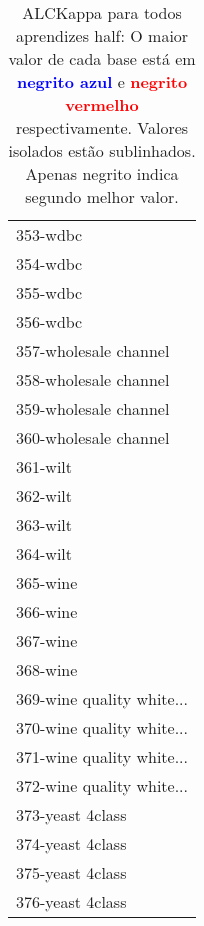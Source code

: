 \begin{table}[h]
\caption{ALCKappa para todos aprendizes half: O maior valor de cada base está em \textcolor{blue}{\textbf{negrito azul}} e \textcolor{red}{\textbf{negrito vermelho}} respectivamente. Valores isolados estão sublinhados. Apenas negrito indica segundo melhor valor.}
\begin{center}\begin{tabular}{l}
 & \\ \hline 353-wdbc &  \\
354-wdbc &  \\
355-wdbc &  \\
356-wdbc &  \\
357-wholesale channel &  \\
358-wholesale channel &  \\
359-wholesale channel &  \\ \hline
360-wholesale channel &  \\
361-wilt &  \\
362-wilt &  \\
363-wilt &  \\
364-wilt &  \\
365-wine &  \\
366-wine &  \\ \hline
367-wine &  \\
368-wine &  \\
369-wine quality white... &  \\
370-wine quality white... &  \\
371-wine quality white... &  \\
372-wine quality white... &  \\
373-yeast 4class &  \\ \hline
374-yeast 4class &  \\
375-yeast 4class &  \\
376-yeast 4class &  \\\end{tabular}\label{stratsALCKappa11Allallb}
\end{center}
\end{table}